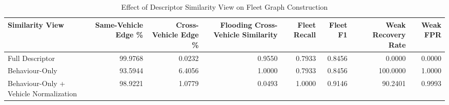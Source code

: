 \begin{table}[t]
\centering
\begin{tabular}{lrrrrrrr}
\toprule
Similarity View & Same-Vehicle Edge \% & Cross-Vehicle Edge \% & Flooding Cross-Vehicle Similarity & Fleet Recall & Fleet F1 & Weak Recovery Rate & Weak FPR \\
\midrule
Full Descriptor & 99.9768 & 0.0232 & 0.9550 & 0.7933 & 0.8456 & 0.0000 & 0.0000 \\
Behaviour-Only & 93.5944 & 6.4056 & 1.0000 & 0.7933 & 0.8456 & 100.0000 & 1.0000 \\
Behaviour-Only + Vehicle Normalization & 98.9221 & 1.0779 & 0.0493 & 1.0000 & 0.9146 & 90.2401 & 0.9993 \\
\bottomrule
\end{tabular}
\caption{Effect of Descriptor Similarity View on Fleet Graph Construction}
\label{tab:similarity-view-ablation}
\end{table}
